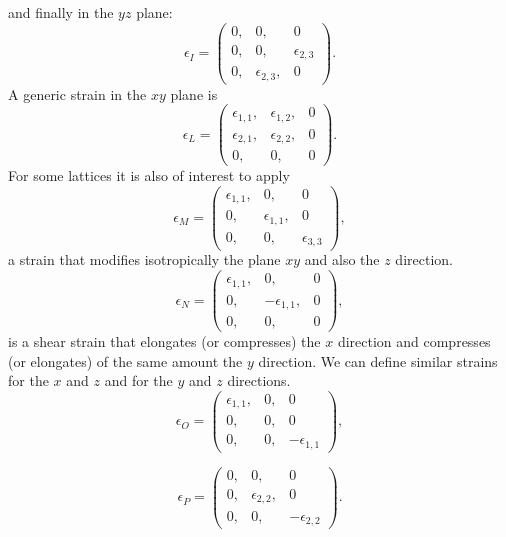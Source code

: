 \documentclass[12pt,a4paper]{article}
\begin{document}
and finally in the $yz$ plane:
\begin{equation}
\epsilon_I=\left( \begin{array}{ccc}
0, & 0, & 0
\\
0, & 0, & \epsilon_{2,3} 
\\
0, & \epsilon_{2,3}, & 0
\end{array}
\right).
\end{equation}
A generic strain in the $xy$ plane is
\begin{equation}
\epsilon_L=\left( \begin{array}{ccc}
\epsilon_{1,1}, & \epsilon_{1,2}, & 0 
\\
\epsilon_{2,1}, & \epsilon_{2,2}, & 0 
\\
0, & 0, & 0
\end{array}
\right).
\end{equation}
For some lattices it is also of interest to apply
\begin{equation}
\epsilon_M=\left( \begin{array}{ccc}
\epsilon_{1,1}, & 0, & 0 
\\
0, & \epsilon_{1,1}, & 0 
\\
0, & 0, & \epsilon_{3,3}
\end{array}
\right),
\end{equation}
a strain that modifies isotropically the plane $xy$ and also the $z$ direction.
\begin{equation}
\epsilon_N=\left( \begin{array}{ccc}
\epsilon_{1,1}, & 0, & 0 
\\
0, & -\epsilon_{1,1}, & 0 
\\
0, & 0, & 0
\end{array}
\right),
\end{equation}
is a shear strain that elongates (or compresses) the $x$ direction and
compresses (or elongates) of the same amount the $y$ direction.
We can define similar strains for the $x$ and $z$ and for 
the $y$ and $z$ directions.
\begin{equation}
\epsilon_O=\left( \begin{array}{ccc}
\epsilon_{1,1}, & 0, & 0 
\\
0, & 0, & 0 
\\
0, & 0, & -\epsilon_{1,1}
\end{array}
\right),
\end{equation}

\begin{equation}
\epsilon_P=\left( \begin{array}{ccc}
0, & 0, & 0 
\\
0, & \epsilon_{2,2}, & 0 
\\
0, & 0, & -\epsilon_{2,2}
\end{array}
\right).
\end{equation}
\end{document}
